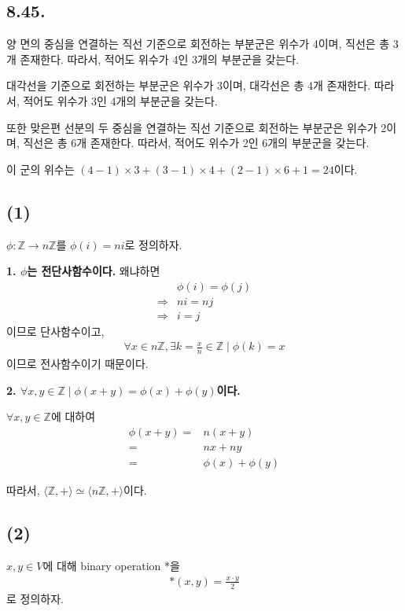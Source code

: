\documentclass{article}
\begin{document}
\subsection{8.45.}
양 면의 중심을 연결하는 직선 기준으로 회전하는 부분군은 위수가 4이며, 직선은 총 3개 존재한다. 따라서, 적어도 위수가 4인 3개의 부분군을 갖는다.

대각선을 기준으로 회전하는 부분군은 위수가 3이며, 대각선은 총 4개 존재한다. 따라서, 적어도 위수가 3인 4개의 부분군을 갖는다.

또한 맞은편 선분의 두 중심을 연결하는 직선 기준으로 회전하는 부분군은 위수가 2이며, 직선은 총 6개 존재한다. 따라서, 적어도 위수가 2인 6개의 부분군을 갖는다.

이 군의 위수는 $(4-1) \times 3 + (3-1) \times 4 + (2-1) \times 6 + 1 = 24$이다.

\subsection{(1)}

$\phi : \mathbb{Z} \rightarrow n\mathbb{Z}$를 $\phi(i) = ni$로 정의하자. 

\textbf{1. $\phi$는 전단사함수이다.}
 왜냐하면
\begin{align*}
&\phi(i) = \phi(j)
\\ \Rightarrow& ni = nj
\\ \Rightarrow& i = j
\end{align*}이므로 단사함수이고,
\begin{align*}
\forall x \in n\mathbb{Z}, \exists k = \frac{x}{n} \in \mathbb{Z} \mid \phi(k) = x
\end{align*}이므로 전사함수이기 때문이다.

\textbf{2. $\forall x, y \in \mathbb{Z} \mid \phi(x + y) = \phi(x) + \phi(y)$이다.}

$\forall x, y \in \mathbb{Z}$에 대하여
\begin{align*}
\phi(x + y) =& n(x + y)
\\ =& nx + ny
\\ =& \phi(x) + \phi(y)
\end{align*}

따라서, $\langle \mathbb{Z}, + \rangle \simeq \langle n\mathbb{Z}, + \rangle$이다.

\subsection{(2)}
$x, y \in V$에 대해 binary operation *을 
\begin{align*}
*(x, y) = \frac{x \cdot y}{2} 
\end{align*}
로 정의하자.
\end{document}
